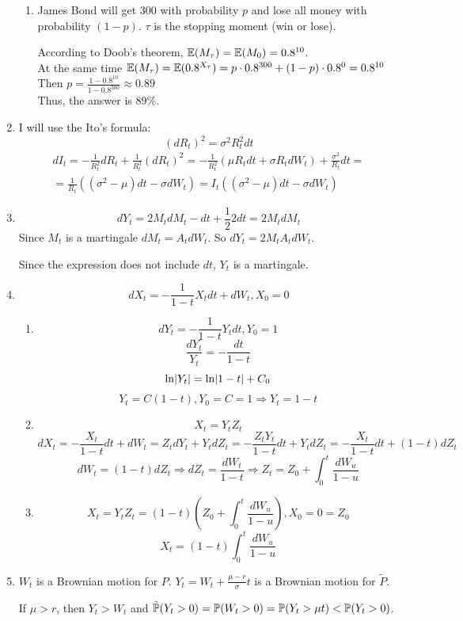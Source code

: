 \documentclass[12pt, a4paper]{article}
\DeclarePairedDelimiter{\abs}{\lvert}{\rvert}
\begin{document}
\begin{enumerate}
\begin{enumerate}
\item James Bond will get 300 with probability $p$ and lose all money with probability $(1-p)$. $\tau$ is the stopping moment (win or lose).

According to Doob's theorem, $\E(M_{\tau})=\E(M_0)=0.8^{10}$.\\
At the same time $\E(M_{\tau})=\E(0.8^{X_{\tau}})=p\cdot 0.8^{300}+(1-p)\cdot 0.8^0=0.8^{10}$\\
Then $p=\frac{1-0.8^{10}}{1-0.8^{300}}\approx0.89$\\
Thus, the answer is 89\%.
\end{enumerate}

\item I will use the Ito's formula:
\[
(dR_t)^2=\sigma^2R_t^2dt
\]
\begin{multline}
dI_t=-\frac{1}{R_t^2}dR_t+\frac{1}{R_t^3} (dR_t)^2=-\frac{1}{R_t^2}(\mu R_t dt+\sigma R_tdW_t)+\frac{\sigma^2}{R_t}dt=\\
=\frac{1}{R_t}((\sigma^2-\mu)dt-\sigma dW_t)=I_t((\sigma^2-\mu)dt-\sigma dW_t)
\end{multline}

\item
\[
dY_t=2M_tdM_t-dt+\frac{1}{2}2dt=2M_tdM_t
\]
Since $M_t$ is a martingale $dM_t = A_t dW_t$. So $dY_t = 2M_t A_t dW_t$.

Since the expression does not include $dt$, $Y_t$ is  a martingale.

\item
\[
dX_t=-\frac{1}{1-t}X_tdt+dW_t,X_0=0
\]
\begin{enumerate}
\item
\[
dY_t=-\frac{1}{1-t}Y_tdt, Y_0=1
\]
\[
\frac{dY_t}{Y_t}=-\frac{dt}{1-t}
\]
\[
\ln\abs{Y_t}=\ln\abs{1-t}+C_0
\]
\[
Y_t=C(1-t), Y_0=C=1\Rightarrow Y_t=1-t
\]
\item
\[
X_t=Y_tZ_t
\]
\[
dX_t=-\frac{X_t}{1-t}dt+dW_t=Z_tdY_t+Y_tdZ_t=-\frac{Z_tY_t}{1-t}dt+Y_tdZ_t=-\frac{X_t}{1-t}dt+(1-t)dZ_t
\]
\[
dW_t=(1-t)dZ_t\Rightarrow dZ_t=\frac{dW_t}{1-t}\Rightarrow Z_t=Z_0+\int_0^t \frac{dW_u}{1-u}
\]
\item
\[
X_t=Y_tZ_t=(1-t)\left(Z_0+\int_0^t \frac{dW_u}{1-u}\right), X_0=0=Z_0
\]
\[
X_t=(1-t)\int_0^t \frac{dW_u}{1-u}
\]
\end{enumerate}

\item
$W_t$ is a Brownian motion for $P$. $Y_t=W_t+\frac{\mu-r}{\sigma} t$ is a Brownian motion for $\tilde P$.

If $\mu>r$, then $Y_t>W_t$ and $\tilde \P(Y_t>0)=\P(W_t>0)=\P(Y_t>\mu t)<\P(Y_t>0)$.


\end{enumerate}
\end{document}
